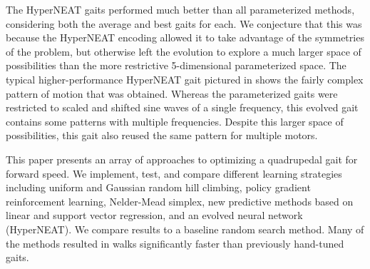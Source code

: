 The HyperNEAT gaits performed much better than all parameterized
methods, considering both the average and best gaits for each.  We
conjecture that this was because the HyperNEAT encoding allowed it to
take advantage of the symmetries of the problem, but otherwise left
the evolution to explore a much larger space of possibilities than the
more restrictive 5-dimensional parameterized space.  The typical
higher-performance HyperNEAT gait pictured in
 shows the fairly
complex pattern of motion that was obtained.  Whereas the
parameterized gaits were restricted to scaled and shifted sine waves
of a single frequency, this evolved gait contains some patterns with
multiple frequencies.  Despite this larger space of possibilities,
this gait also reused the same pattern for multiple motors.






This paper presents an array of approaches to optimizing a quadrupedal
gait for forward speed.  We implement, test, and compare different
learning strategies including uniform and Gaussian random hill
climbing, policy gradient reinforcement learning,
Nelder-Mead simplex, new predictive methods based on linear
and support vector regression, and an evolved neural network
(HyperNEAT).  We compare results to a baseline random
search method.  Many of the methods resulted in walks significantly
faster than previously hand-tuned gaits.



